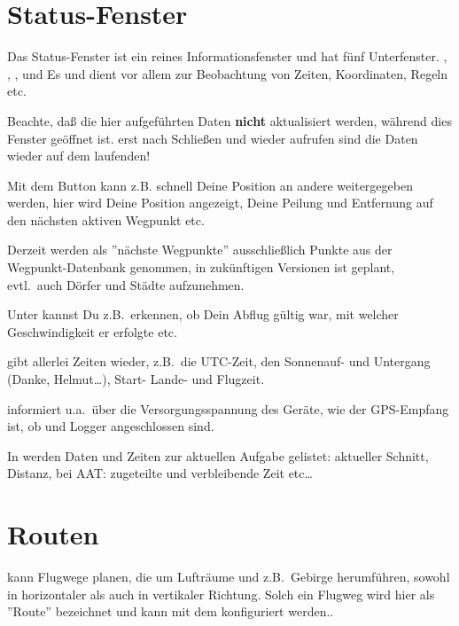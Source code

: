 \section{Status-Fenster}\label{sec:aircr-stat-dial}

Das Status-Fenster ist ein reines Informationsfenster und hat fünf Unterfenster. , , ,  und  Es 
 und dient vor allem zur Beobachtung von Zeiten, Koordinaten, Regeln etc.\  
  
\achtung Beachte, daß die hier aufgeführten Daten \textbf{nicht} aktualisiert werden, während dies Fenster geöffnet ist. erst nach Schließen und wieder aufrufen sind die Daten wieder auf dem laufenden! 

Mit dem Button  kann z.B. schnell Deine Position an andere 
weitergegeben werden, hier wird Deine Position angezeigt, Deine Peilung und Entfernung auf den nächsten aktiven Wegpunkt etc. 


Derzeit werden als ''nächste Wegpunkte'' ausschließlich Punkte aus der Wegpunkt-Datenbank genommen, in zukünftigen Versionen ist geplant, evtl.\  auch Dörfer und Städte aufzunehmen.%

Unter kannst Du z.B.\ erkennen, ob Dein Abflug gültig war, mit welcher Geschwindigkeit er erfolgte etc.\ 

gibt allerlei Zeiten wieder, z.B.\ die UTC-Zeit, den Sonnenauf- und Untergang (Danke, Helmut\dots), Start- Lande- und Flugzeit. 

informiert u.a.\ über die Versorgungsspannung des Geräte, wie der GPS-Empfang ist, ob \fl und Logger angeschlossen sind. 

In werden Daten und Zeiten zur aktuellen Aufgabe gelistet: aktueller Schnitt, Distanz, bei AAT: zugeteilte und verbleibende Zeit etc\dots 


\section{Routen}\label{sec:route}

\xc kann Flugwege planen, die um Lufträume und z.B.\ Gebirge herumführen, sowohl in 
horizontaler als auch in vertikaler Richtung. Solch ein Flugweg wird hier als ''Route'' bezeichnet und kann mit dem  konfiguriert werden..

